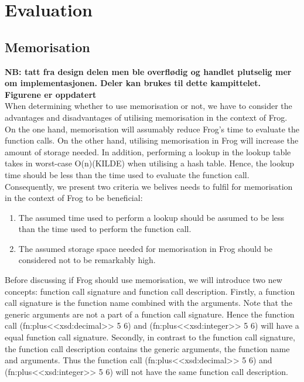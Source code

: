 \section{Evaluation}
\label{implementation_evaluation}

\subsection{Memorisation}
\textbf{NB: tatt fra design delen men ble overflødig og handlet plutselig mer om implementasjonen. Deler kan brukes til dette kampittelet. Figurene er oppdatert}
\\
When determining whether to use memorisation or not, we have to consider the advantages and disadvantages of utilising memorisation in the context of Frog. On the one hand, memorisation will assumably reduce Frog's time to evaluate the function calls. On the other hand, utilising memorisation in Frog will increase the amount of storage needed. In addition, performing a lookup in the lookup table takes in worst-case O(n)(KILDE) when utilising a hash table. Hence, the lookup time should be less than the time used to evaluate the function call. Consequently, we present two criteria we belives needs to fulfil for memorisation in the context of Frog to be beneficial:
\begin{enumerate}
    \item The assumed time used to perform a lookup should be assumed to be less than the time used to perform the function call.
    \item The assumed storage space needed for memorisation in Frog should be considered not to be remarkably high. 
\end{enumerate}

\para 
Before discussing if Frog should use memorisation, we will introduce two new concepts: function call signature and function call description. 
Firstly, a function call signature is the function name combined with the arguments. Note that the generic arguments are not a part of a function call signature. Hence the function call (fn:plus<<xsd:decimal>> 5 6) and (fn:plus<<xsd:integer>> 5 6) will have a equal function call signature. Secondly, in contrast to the function call signature, the function call description contains the generic arguments, the function name and arguments. Thus the function call (fn:plus<<xsd:decimal>> 5 6) and (fn:plus<<xsd:integer>> 5 6) will not have the same function call description.

